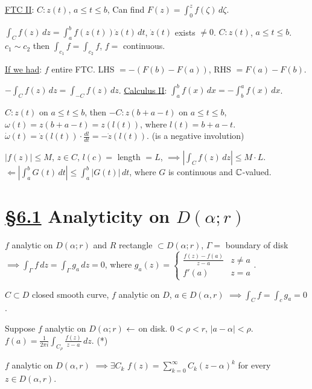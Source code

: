 \documentclass[]{article}
\begin{document}
\underline{FTC II}: $C:z(t)$, $a\leq t \leq b$, Can find $F(z) = \int_0^{z} f(\zeta) \, d\zeta$.

$\int_C f(z) \, dz = \int_a^b f(z(t)) \dot{z}(t) \, dt$, $\dot{z}(t)$ exists $\neq 0$. $C:z(t)$, $a\leq t \leq b$. $c_1\sim c_2$ then $\int_{c_1}f = \int_{c_2} f$, $f = $ continuous.

\underline{If we had}: $f$ entire FTC. LHS $ = -(F(b)-F(a))$, RHS $ = F(a)-F(b)$.

$- \int_C f(z) \, dz = \int_{-C} f(z) \, dz$. \underline{Calculus II}: $\int_a^b f(x) \, dx = -\int_b^a f(x) \, dx$.

$C:z(t)$ on $a\leq t \leq b$, then $-C:z(b+a-t)$ on $a\leq t \leq b$, $\omega(t) = z(b+a-t) = z(l(t))$, where $l(t) = b+a-t$. $\dot{\omega}(t) = \dot{z}(l(t)) \cdot \frac{dl}{dt} = -\dot{z}(l(t))$. (is a negative involution)

\begin{recall}
	 $|f(z)|\leq M$, $z\in C$, $l(c) = $ length $ = L$, $\implies \left| \int_C f(z) \, dz \right| \leq M\cdot L$. $\Leftarrow \left| \int_a^b G(t) \, dt \right| \leq \int_a^b |G(t)| \, dt$, where $G$ is continuous and $\mathbb{C}$-valued.
\end{recall}

\section{\underline{\S6.1} Analyticity on $D(\alpha;r)$}
\begin{recall}
	 $f$ analytic on $D(\alpha;r)$ and $R$ rectangle $\subset D(\alpha;r)$, $\Gamma = $ boundary of disk $\implies \int_{\Gamma}f\, dz = \int_{\Gamma} g_a \, dz = 0$, where $g_a(z) = \begin{cases}
	\frac{f(z)-f(a)}{z-a} & z\neq a \\ f'(a) & z=a \end{cases}$.
\end{recall}

\begin{theorem}
	 $C\subset D$ closed smooth curve, $f$ analytic on $D$, $a\in D(\alpha,r)$ $\implies \int_C f = \int_c g_a = 0$.
\end{theorem}
\begin{theorem}
	 Suppose $f$ analytic on $D(\alpha;r)$ $\leftarrow$ on disk. $0<\rho<r$, $|a-\alpha|<\rho$. $f(a) = \frac{1}{2\pi i} \int_{C_\rho} \frac{f(z)}{z-a} \, dz$. (*)
\end{theorem}
\begin{definition}
	 $f$ analytic on $D(\alpha,r)$ $\implies \exists C_k$ $f(z) = \sum_{k=0}^\infty C_k(z-\alpha)^k$ for every $z\in D(\alpha,r)$.
\end{definition}
\end{document}
